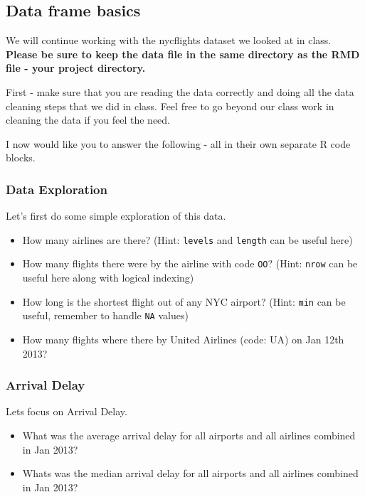 \documentclass[
]{article}
\begin{document}
\hypertarget{data-frame-basics}{%
\subsection{Data frame basics}\label{data-frame-basics}}

We will continue working with the nycflights dataset we looked at in
class. \textbf{Please be sure to keep the data file in the same
directory as the RMD file - your project directory.}

First - make sure that you are reading the data correctly and doing all
the data cleaning steps that we did in class. Feel free to go beyond our
class work in cleaning the data if you feel the need.

I now would like you to answer the following - all in their own separate
R code blocks.

\hypertarget{data-exploration}{%
\subsubsection{Data Exploration}\label{data-exploration}}

Let's first do some simple exploration of this data.

\begin{itemize}
\item
  How many airlines are there? (Hint: \texttt{levels} and
  \texttt{length} can be useful here)
\item
  How many flights there were by the airline with code \texttt{OO}?
  (Hint: \texttt{nrow} can be useful here along with logical indexing)
\item
  How long is the shortest flight out of any NYC airport? (Hint:
  \texttt{min} can be useful, remember to handle \texttt{NA} values)
\item
  How many flights where there by United Airlines (code: UA) on Jan 12th
  2013?
\end{itemize}

\hypertarget{arrival-delay}{%
\subsubsection{Arrival Delay}\label{arrival-delay}}

Lets focus on Arrival Delay.

\begin{itemize}
\item
  What was the average arrival delay for all airports and all airlines
  combined in Jan 2013?
\item
  Whats was the median arrival delay for all airports and all airlines
  combined in Jan 2013?
\end{itemize}
\end{document}
